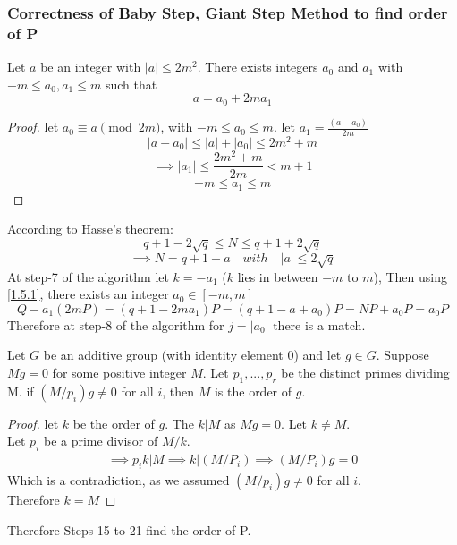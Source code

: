 \subsubsection{Correctness of Baby Step, Giant Step Method to find order of P}
\begin{lemma} \label{1.5.1}
    Let $a$ be an integer with $|a| \leq 2m^2$. There exists integers $a_0$ and $a_1$ with $-m \leq a_0, a_1 \leq m$ such that
    \[a = a_0 + 2ma_1\]
\end{lemma}
\begin{proof}
    let $a_0 \equiv a \pmod{2m}$, with $-m \leq a_0 \leq m$. let $a_1 = \frac{(a-a_0)}{2m}$
    \[|a - a_0| \leq |a| + |a_0| \leq 2m^2 + m\]
    \[\implies |a_1| \leq \frac{2m^2 + m}{2m} < m+1 \]
    \[-m \leq a_1 \leq m \]
\end{proof}
\noindent According to Hasse's theorem: 
\[q+1-2\sqrt{q} \leq N \leq q+1+2\sqrt{q}\]
\[\implies N = q + 1 - a \quad with \quad |a| \leq 2\sqrt{q}\]
At step-7 of the algorithm let $k = -a_1$ ($k$ lies in between $-m$ to $m$), Then using \ref{1.5.1}, there exists an integer $a_0 \in [-m, m]$
\[Q - a_1(2mP) = (q+1-2ma_1)P = (q+1-a+a_0)P = NP + a_0P = a_0P\]
Therefore at step-8 of the algorithm for $j = |a_0|$ there is a match.

\begin{lemma}
    Let $G$ be an additive group (with identity element $0$) and let $g \in G$. Suppose $Mg=0$ for some positive integer $M$. Let $p_1,...,p_r$ be the distinct primes dividing M. if $(M/p_i)g \neq 0$ for all $i$, then $M$ is the order of $g$.
\end{lemma}
\begin{proof}
    let $k$ be the order of $g$. The $k|M$ as $Mg=0$. Let $k \neq M$.\\
    Let $p_i$ be a prime divisor of $M/k$.
    \begin{align*}
        \implies p_ik|M 
        \implies k|(M/P_i) 
        \implies (M/P_i)g = 0
    \end{align*}
    Which is a contradiction, as we assumed $(M/p_i)g \neq 0$ for all $i$.\\
    Therefore $k=M$
\end{proof}
\noindent Therefore Steps 15 to 21 find the order of P.